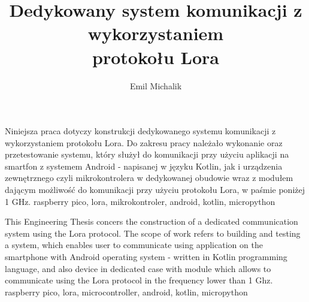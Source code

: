 \documentclass[
    left=2.5cm,         %
    right=2.5cm,        %
    top=2.5cm,          %
    bottom=3cm,         %
    bindingoffset=6mm,  %
    nohyphenation=false %
]{eiti/eiti-thesis}
\begin{document}
\EngineerThesis %
{}
\title{
    Dedykowany system komunikacji z wykorzystaniem \\
    protokołu Lora
}
\author{{Emil Michalik}}
\date{\the\year}
\maketitle

\cleardoublepage %
\streszczenie
Niniejsza praca dotyczy konstrukcji dedykowanego systemu komunikacji z wykorzystaniem protokołu Lora.
Do zakresu pracy należało wykonanie oraz przetestowanie systemu, który służył do komunikacji przy użyciu aplikacji na smartfon z systemem Android - napisanej w języku Kotlin, jak i urządzenia zewnętrznego czyli mikrokontrolera w dedykowanej obudowie wraz z modułem dającym możliwość do komunikacji przy użyciu protokołu Lora, w paśmie poniżej 1 GHz.
\slowakluczowe raspberry pico, lora, mikrokontroler, android, kotlin, micropython

\newpage
\abstract
This Engineering Thesis concers the construction of a dedicated communication system using the Lora protocol.
The scope of work refers to building and testing a system, which enables user to communicate using application on the smartphone with Android operating system - written in Kotlin programming language, and also device in dedicated case with module which allows to communicate using the Lora protocol in the frequency lower than 1 Ghz.
\keywords raspberry pico, lora, microcontroller, android, kotlin, micropython

\cleardoublepage  %
\pagestyle{plain}
\makeauthorship

\cleardoublepage %
\tableofcontents
\end{document}
